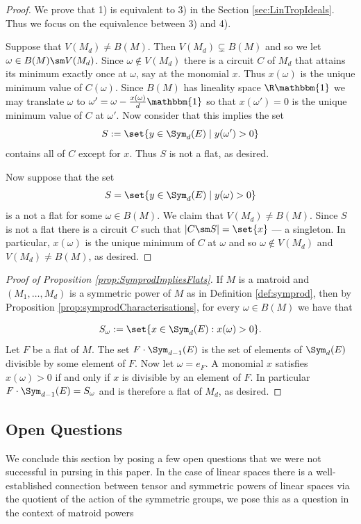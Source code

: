 \begin{proof} We prove that 1) is equivalent to 3) in the Section \ref{sec:LinTropIdeals}. Thus we focus on the equivalence between 3) and 4).

Suppose that $V(M_d)\neq B(M)$. Then $V(M_d)\subsetneq B(M)$ and so we let $\omega\in B(M)\sm V(M_d)$. Since $\omega\notin V(M_d)$ there is a circuit $C$ of $M_d$ that attains its minimum exactly once at $\omega$, say at the monomial $x$. Thus $x(\omega)$ is the unique minimum value of $C(\omega)$. Since $B(M)$ has lineality space $\R\mathbbm{1}$ we may translate $\omega$ to $\omega' = \omega- \frac{x(\omega)}{d} \mathbbm{1}$ so that $x(\omega')=0$ is the unique minimum value of $C$ at $\omega'$. Now consider that this implies the set
$$S:=\set{y\in \Sym_d(E)\mid y(\omega')>0}$$
contains all of $C$ except for $x$. Thus $S$ is not a flat, as desired.

Now suppose that the set 
$$S = \set{y\in \Sym_d(E)\mid y(\omega)>0}$$
is a not a flat for some $\omega\in B(M)$. We claim that $V(M_d)\neq B(M)$. Since $S$ is not a flat there is a circuit $C$ such that $|C\sm S|=\set{x}$ --- a singleton. In particular, $x(\omega)$ is the unique minimum of $C$ at $\omega$ and so $\omega\notin V(M_d)$ and $V(M_d)\neq B(M)$, as desired.
\end{proof}

\begin{proof}[Proof of Proposition \ref{prop:SymprodImpliesFlats}]
If $M$ is a matroid and $(M_1,\dots,M_d)$ is a symmetric power of $M$ as in Definition \ref{def:symprod}, then by Proposition \ref{prop:symprodCharacterisations}, for every $\omega\in B(M)$ we have that

$$S_\omega:= \set{x\in \Sym_d(E): x(\omega)>0}.$$
Let $F$ be a flat of $M$. The set $F\cdot \Sym_{d-1}(E)$ is the set of elements of $\Sym_d(E)$ divisible by some element of $F$. Now let $\omega= e_F$. A monomial $x$ satisfies $x(\omega)>0$ if and only if $x$ is divisible by an element of $F$. In particular $F\cdot\Sym_{d-1}(E)=S_\omega$ and is therefore a flat of $M_d$, as desired.
\end{proof}

\subsection{Open Questions}\label{subsec:openQuestions}

We conclude this section by posing a few open questions that we were not successful in pursing in this paper. In the case of linear spaces there is a well-established connection between tensor and symmetric powers of linear spaces via the quotient of the action of the symmetric groups, we pose this as a question in the context of matroid powers

